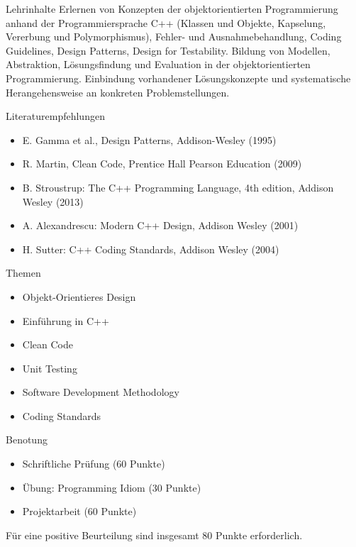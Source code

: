 \documentclass{beamer}
\begin{document}
\begin{frame}{Lehrinhalte}
Erlernen von Konzepten der objektorientierten Programmierung anhand der
Programmiersprache C++ (Klassen und Objekte, Kapselung, Vererbung und
Polymorphismus), Fehler- und Ausnahmebehandlung, Coding Guidelines, Design
Patterns, Design for Testability. Bildung von Modellen, Abstraktion,
Lösungsfindung und Evaluation in der  objektorientierten Programmierung.
Einbindung vorhandener Lösungskonzepte und systematische Herangehensweise an
konkreten Problemstellungen.
\end{frame}

\begin{frame}{Literaturempfehlungen}
\begin{itemize}
\item E. Gamma et al., Design Patterns, Addison-Wesley (1995)
\item R. Martin, Clean Code, Prentice Hall Pearson Education (2009)
\item B. Stroustrup: The C++ Programming Language, 4th edition, Addison Wesley
(2013)
\item A. Alexandrescu: Modern C++ Design, Addison Wesley (2001)
\item H. Sutter: C++ Coding Standards, Addison Wesley (2004)
\end{itemize}
\end{frame}

\begin{frame}{Themen}
\begin{itemize}
  \item Objekt-Orientieres Design
  \item Einführung in C++
  \item Clean Code
  \item Unit Testing
  \item Software Development Methodology
  \item Coding Standards
\end{itemize}
\end{frame}

\begin{frame}{Benotung}
\begin{itemize}
  \item Schriftliche Prüfung (60 Punkte)
  \item Übung: Programming Idiom (30 Punkte)
  \item Projektarbeit (60 Punkte)
\end{itemize}
Für eine positive Beurteilung sind insgesamt 80 Punkte erforderlich.
\end{frame}
\end{document}
